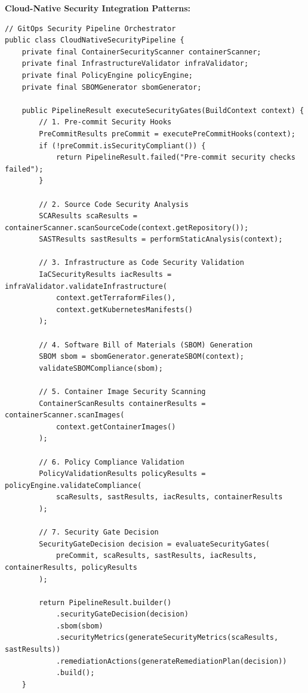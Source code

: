\textbf{Cloud-Native Security Integration Patterns:}
\begin{lstlisting}[breaklines=true,basicstyle=\ttfamily\footnotesize]
// GitOps Security Pipeline Orchestrator
public class CloudNativeSecurityPipeline {
    private final ContainerSecurityScanner containerScanner;
    private final InfrastructureValidator infraValidator;
    private final PolicyEngine policyEngine;
    private final SBOMGenerator sbomGenerator;
    
    public PipelineResult executeSecurityGates(BuildContext context) {
        // 1. Pre-commit Security Hooks
        PreCommitResults preCommit = executePreCommitHooks(context);
        if (!preCommit.isSecurityCompliant()) {
            return PipelineResult.failed("Pre-commit security checks failed");
        }
        
        // 2. Source Code Security Analysis
        SCAResults scaResults = containerScanner.scanSourceCode(context.getRepository());
        SASTResults sastResults = performStaticAnalysis(context);
        
        // 3. Infrastructure as Code Security Validation
        IaCSecurityResults iacResults = infraValidator.validateInfrastructure(
            context.getTerraformFiles(),
            context.getKubernetesManifests()
        );
        
        // 4. Software Bill of Materials (SBOM) Generation
        SBOM sbom = sbomGenerator.generateSBOM(context);
        validateSBOMCompliance(sbom);
        
        // 5. Container Image Security Scanning
        ContainerScanResults containerResults = containerScanner.scanImages(
            context.getContainerImages()
        );
        
        // 6. Policy Compliance Validation
        PolicyValidationResults policyResults = policyEngine.validateCompliance(
            scaResults, sastResults, iacResults, containerResults
        );
        
        // 7. Security Gate Decision
        SecurityGateDecision decision = evaluateSecurityGates(
            preCommit, scaResults, sastResults, iacResults, containerResults, policyResults
        );
        
        return PipelineResult.builder()
            .securityGateDecision(decision)
            .sbom(sbom)
            .securityMetrics(generateSecurityMetrics(scaResults, sastResults))
            .remediationActions(generateRemediationPlan(decision))
            .build();
    }
    

\end{lstlisting}
